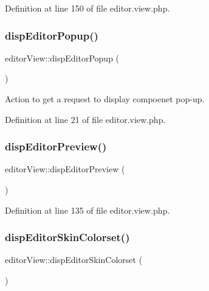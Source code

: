 Definition at line 150 of file editor.\+view.\+php.

\hypertarget{classeditorView_aaa8f777f947452daa94610edc7dc4790}{}\label{classeditorView_aaa8f777f947452daa94610edc7dc4790} 
\subsubsection{\texorpdfstring{disp\+Editor\+Popup()}{dispEditorPopup()}}
{\footnotesize\ttfamily editor\+View\+::disp\+Editor\+Popup (\begin{DoxyParamCaption}{ }\end{DoxyParamCaption})}



Action to get a request to display compoenet pop-\/up. 



Definition at line 21 of file editor.\+view.\+php.

\hypertarget{classeditorView_a2e119bf18da5d6100ca7801967b09716}{}\label{classeditorView_a2e119bf18da5d6100ca7801967b09716} 
\subsubsection{\texorpdfstring{disp\+Editor\+Preview()}{dispEditorPreview()}}
{\footnotesize\ttfamily editor\+View\+::disp\+Editor\+Preview (\begin{DoxyParamCaption}{ }\end{DoxyParamCaption})}



Definition at line 135 of file editor.\+view.\+php.

\hypertarget{classeditorView_a5ef060fe6ef3a5e41a94a8c02cd2860c}{}\label{classeditorView_a5ef060fe6ef3a5e41a94a8c02cd2860c} 
\subsubsection{\texorpdfstring{disp\+Editor\+Skin\+Colorset()}{dispEditorSkinColorset()}}
{\footnotesize\ttfamily editor\+View\+::disp\+Editor\+Skin\+Colorset (\begin{DoxyParamCaption}{ }\end{DoxyParamCaption})}



